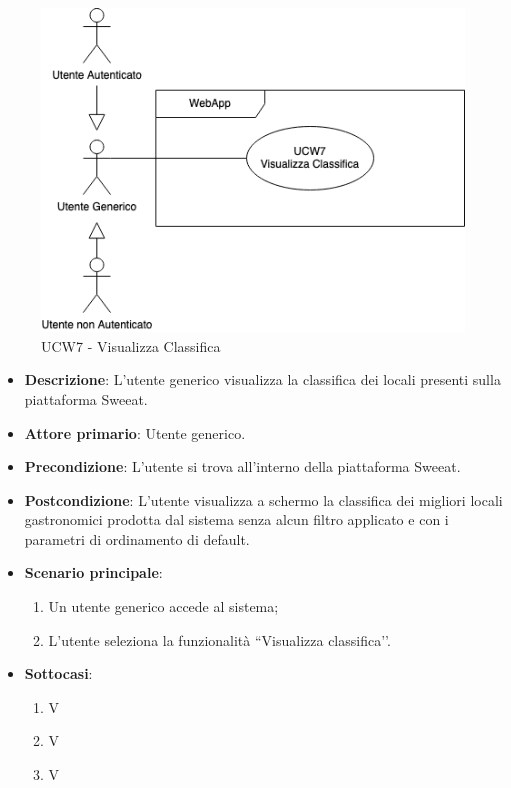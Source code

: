 \begin{figure}[!h]
\centering
\includegraphics[scale=0.5]{UC_images/UCW7.png}
\caption{UCW7 - Visualizza Classifica}
\end{figure}
\begin{center}
\end{center}
\begin{itemize}
	\item \textbf{Descrizione}: L'utente generico visualizza la classifica dei locali presenti sulla piattaforma Sweeat.
    \item \textbf{Attore primario}: Utente generico.
    \item \textbf{Precondizione}: L’utente si trova all’interno della piattaforma Sweeat.
    \item \textbf{Postcondizione}: L’utente visualizza a schermo la classifica dei migliori locali gastronomici prodotta dal sistema senza alcun filtro applicato e con i parametri di ordinamento di default.
    \item \textbf{Scenario principale}: 
    \begin{enumerate}
        \item Un utente generico accede al sistema;
        \item L’utente seleziona la funzionalità “Visualizza classifica’’.
    \end{enumerate}
	\item \textbf{Sottocasi}:
	\begin{enumerate}
	\item V
	\item V
	\item V
	\end{enumerate}    
\end{itemize}

